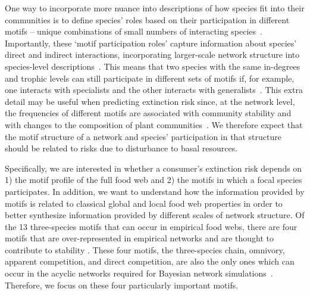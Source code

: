 \documentclass[12pt]{article}
\begin{document}
\begin{spacing}{2.0}
    One way to incorporate more nuance into descriptions of how species fit into their communities is to define species' roles based on their participation in different motifs -- unique combinations of small numbers of interacting species~\citep{Stouffer2007,Stouffer2012}. Importantly, these `motif participation roles' capture information about species' direct and indirect interactions, incorporating larger-scale network structure into species-level descriptions~\citep{Cirtwill2015JAE}. 
    This means that two species with the same in-degrees and trophic levels can still participate in different sets of motifs if, for example, one interacts with specialists and the other interacts with generalists~\citep{Cirtwill2018FoodWebs}. 
    This extra detail  may be useful when predicting  extinction risk since, at the network level, the frequencies of different motifs are associated with community stability \citep{prill2005dynamic, bascompte2005simple} and with changes to the composition of plant communities~\cite{giling2019plant}. 
    We therefore expect that the motif structure of a network and species' participation in that structure should be related to risks due to disturbance to basal resources. 
    
    Specifically, we are interested in whether a consumer's extinction risk depends on 1) the motif profile of the full food web and 2) the motifs in which a focal species participates. 
    In addition, we want to understand how the information provided by motifs is related to classical global and local food web properties in order to better synthesize information provided by different scales of network structure.
    Of the 13 three-species motifs that can occur in empirical food webs, there are four motifs that are over-represented in empirical networks and are thought to contribute to stability \citep{Stouffer2007, Borrelli2015a, giling2019plant}. These four motifs, the three-species chain, omnivory, apparent competition, and direct competition, are also the only ones which can occur in the acyclic networks required for Bayesian network simulations~\citep{Eklof2013}. 
    Therefore, we focus on these four particularly important motifs.  
    


\end{spacing}
\end{document}
